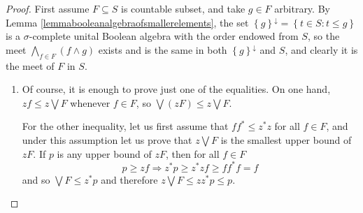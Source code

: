 \begin{proof}
First assume $F\subseteq S$ is countable subset, and take $g\in F$ arbitrary. By Lemma \ref{lemmabooleanalgebraofsmallerelements}, the set $\left\{g\right\}^{\downarrow}=\left\{t\in S:t\leq g\right\}$ is a $\sigma$-complete unital Boolean algebra with the order endowed from $S$, so the meet $\bigwedge_{f\in F}(f\land g)$ exists and is the same in both $\left\{g\right\}^{\downarrow}$ and $S$, and clearly it is the meet of $F$ in $S$.
\begin{enumerate}
\item[(a)] Of course, it is enough to prove just one of the equalities. On one hand, $zf\leq z\bigvee F$ whenever $f\in F$, so $\bigvee(zF)\leq z\bigvee F$.

For the other inequality, let us first assume that $ff^*\leq z^*z$ for all $f\in F$, and under this assumption let us prove that $z\bigvee F$ is the smallest upper bound of $zF$. If $p$ is any upper bound of $zF$, then for all $f\in F$
\[p\geq zf\Longrightarrow z^*p\geq z^*zf\geq ff^*f=f\]
and so $\bigvee F\leq z^*p$ and therefore $z\bigvee F\leq zz^*p\leq p$.


\end{enumerate}
\end{proof}
